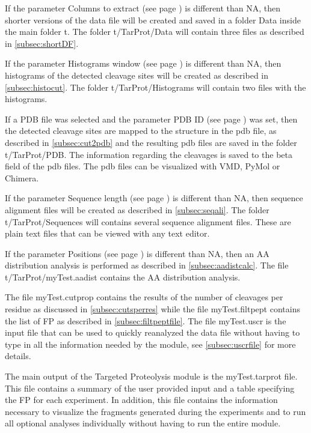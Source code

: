 If the parameter Columns to extract (see page \pageref{par:enzdigColExt}) is different than NA, then shorter versions of the data file will be created and saved in a folder Data inside the main folder t. The folder t/TarProt/Data will\label{par:datafilesenzdig} contain three files as described in \autoref{subsec:shortDF}.

If the parameter Histograms window (see page \pageref{par:enzdigHist}) is different than NA, then histograms of the detected cleavage sites will be created as described in \autoref{subsec:histocut}. The folder t/TarProt/Histograms will contain two files with the histograms.

If a PDB file was selected and the parameter PDB ID  (see page \pageref{par:pdbID}) was set, then the detected cleavage sites are mapped to the structure in the pdb file, as described in \autoref{subsec:cut2pdb} and the resulting pdb files are saved in the folder t/TarProt/PDB. The information regarding the cleavages is saved to the beta field of the pdb files. The pdb files can be visualized with VMD, PyMol or Chimera. 
  
If the parameter Sequence length (see page \pageref{par:enzdigSeqL}) is different than NA, then sequence alignment files will be created as described in \autoref{subsec:seqali}. The folder t/TarProt/Sequences will contains several sequence alignment files. These are plain text files that can be viewed with any text editor.

If the parameter Positions (see page \pageref{par:enzdigPos}) is different than NA, then an AA distribution analysis is performed as described in \autoref{subsec:aadistcalc}. The file t/TarProt/myTest.aadist contains the AA distribution analysis.

The file myTest.cutprop contains the results of the number of cleavages per residue as discussed in \autoref{subsec:cutsperres} while the file myTest.filtpept contains the list of FP as described in \autoref{subsec:filtpeptfile}. The file myTest.uscr is the input file that can be used to quickly reanalyzed the data file without having to type in all the information needed by the module, see \autoref{subsec:uscrfile} for more details. 

The main output of the Targeted Proteolysis module is the myTest.tarprot file. This file contains a summary of the user provided input and a table specifying the FP for each experiment. In addition, this file contains the information necessary to visualize the fragments generated during the experiments and to run all optional analyses individually without having to run the entire module.


